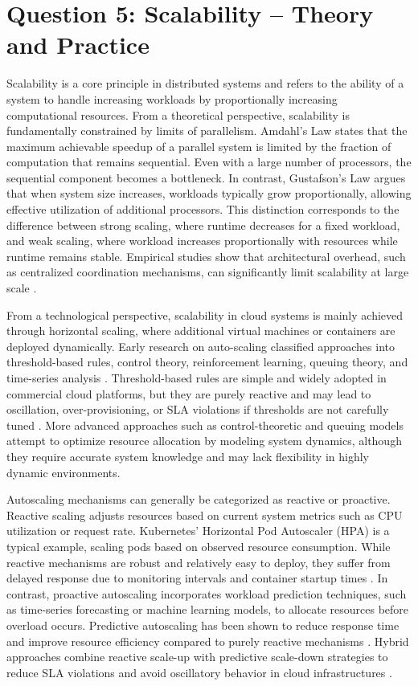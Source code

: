 \section{Question 5: Scalability -- Theory and Practice}

Scalability is a core principle in distributed systems and refers to the ability of a system to handle increasing workloads by proportionally increasing computational resources. From a theoretical perspective, scalability is fundamentally constrained by limits of parallelism. Amdahl’s Law states that the maximum achievable speedup of a parallel system is limited by the fraction of computation that remains sequential. Even with a large number of processors, the sequential component becomes a bottleneck. In contrast, Gustafson’s Law argues that when system size increases, workloads typically grow proportionally, allowing effective utilization of additional processors. This distinction corresponds to the difference between strong scaling, where runtime decreases for a fixed workload, and weak scaling, where workload increases proportionally with resources while runtime remains stable. Empirical studies show that architectural overhead, such as centralized coordination mechanisms, can significantly limit scalability at large scale \cite{lunacek2013}.

From a technological perspective, scalability in cloud systems is mainly achieved through horizontal scaling, where additional virtual machines or containers are deployed dynamically. Early research on auto-scaling classified approaches into threshold-based rules, control theory, reinforcement learning, queuing theory, and time-series analysis \cite{lorido2014}. Threshold-based rules are simple and widely adopted in commercial cloud platforms, but they are purely reactive and may lead to oscillation, over-provisioning, or SLA violations if thresholds are not carefully tuned \cite{lorido2014}. More advanced approaches such as control-theoretic and queuing models attempt to optimize resource allocation by modeling system dynamics, although they require accurate system knowledge and may lack flexibility in highly dynamic environments.

Autoscaling mechanisms can generally be categorized as reactive or proactive. Reactive scaling adjusts resources based on current system metrics such as CPU utilization or request rate. Kubernetes’ Horizontal Pod Autoscaler (HPA) is a typical example, scaling pods based on observed resource consumption. While reactive mechanisms are robust and relatively easy to deploy, they suffer from delayed response due to monitoring intervals and container startup times \cite{dogani2023}. In contrast, proactive autoscaling incorporates workload prediction techniques, such as time-series forecasting or machine learning models, to allocate resources before overload occurs. Predictive autoscaling has been shown to reduce response time and improve resource efficiency compared to purely reactive mechanisms \cite{ju2021}. Hybrid approaches combine reactive scale-up with predictive scale-down strategies to reduce SLA violations and avoid oscillatory behavior in cloud infrastructures \cite{ali2012}.

